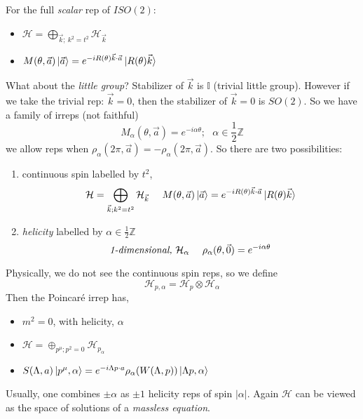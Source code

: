 For the full \textit{scalar} rep of $ISO(2)$: 
\begin{itemize}
    \item $\mathcal{H} = \bigoplus_{\vec{k}; \ k^2=t^2}\mathcal{H}_{\vec{k}}$
    \item $M(\theta,\vec{a})\ket{\vec{a}} = e^{-iR(\theta)\vec{k}\cdot\vec{a}}\ket{R(\theta)\vec{k}}$
\end{itemize}
What about the \textit{little group}? Stabilizer of $\vec{k}$ is $\mathbb{I}$ (trivial little group). However if we take the trivial rep: $\vec{k}=0$, then the stabilizer of $\vec{k}=0$ is $SO(2)$. So we have a family of irreps (not faithful) 
\begin{equation}
    M_{\alpha}(\theta,\vec{a}) = e^{-i\alpha\theta}; \ \ \ \alpha\in\frac{1}{2}\mathbb{Z}
\end{equation}
we allow reps when $\rho_{\alpha}(2\pi, \vec{a}) = -\rho_{\alpha}(2\pi, \vec{a})$. So there are two possibilities: 
\begin{enumerate}
    \item continuous spin labelled by $t^2$,
    \begin{equation}
        \mathcal{H} = \bigoplus_{\vec{k};k^2=t^2}\mathcal{H}_{\vec{k}}\ \ \ \ M(\theta,\vec{a})\ket{\vec{a}} = e^{-iR(\theta)\vec{k}\cdot\vec{a}}\ket{R(\theta)\vec{k}}
    \end{equation}
    \item \textit{helicity} labelled by $\alpha\in \frac{1}{2}\mathbb{Z}$
    \begin{equation}
        \text{\textit{1-dimensional,} } \mathcal{H}_{\alpha}\ \ \ \ \rho_{\alpha}(\theta, \vec{0}) = e^{-i\alpha\theta} 
    \end{equation}
\end{enumerate}
Physically, we do not see the continuous spin reps, so we define
\begin{equation}
    \mathcal{H}_{p,\alpha} = \mathcal{H}_p\otimes\mathcal{H}_\alpha
\end{equation}
Then the Poincar\'e irrep has, 
\begin{itemize}
    \item $m^2=0$, with helicity, $\alpha$
    \item $\mathcal{H} = \oplus_{p^{\mu};p^2=0}\mathcal{H}_{p_{\alpha}}$
    \item $S(\Lambda, a)\ket{p^{\mu}, \alpha} = e^{-i\Lambda p\cdot a}\rho_{\alpha}(W(\Lambda, p))\ket{\Lambda p, \alpha}$
\end{itemize}
Usually, one combines $\pm\alpha$ as $\pm 1$ helicity reps of spin $|\alpha|$. Again $\mathcal{H}$ can be viewed as the space of solutions of a \textit{massless equation}.

